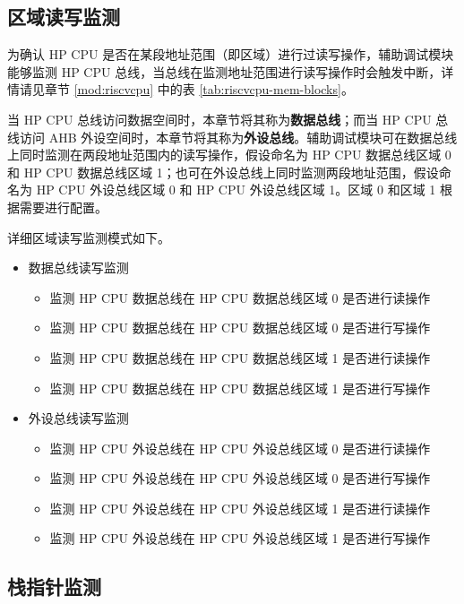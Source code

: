 \documentclass[main\_\_CN.tex]{subfiles}
\begin{document}
\subsection{区域读写监测}

为确认 HP CPU 是否在某段地址范围（即区域）进行过读写操作，辅助调试模块能够监测 HP CPU 总线，当总线在监测地址范围进行读写操作时会触发中断，详情请见章节 \ref{mod:riscvcpu} \textit{} 中的表 \ref{tab:riscvcpu-mem-blocks}。

当 HP CPU 总线访问数据空间时，本章节将其称为\textbf{数据总线}；而当 HP CPU 总线访问 AHB 外设空间时，本章节将其称为\textbf{外设总线}。辅助调试模块可在数据总线上同时监测在两段地址范围内的读写操作，假设命名为 HP CPU 数据总线区域 0 和 HP CPU 数据总线区域 1；也可在外设总线上同时监测两段地址范围，假设命名为 HP CPU 外设总线区域 0 和 HP CPU 外设总线区域 1。区域 0 和区域 1 根据需要进行配置。

详细区域读写监测模式如下。
\begin{itemize}
    \item 数据总线读写监测
        \begin{itemize}
            \item 监测 HP CPU 数据总线在 HP CPU 数据总线区域 0 是否进行读操作
            \item 监测 HP CPU 数据总线在 HP CPU 数据总线区域 0 是否进行写操作
            \item 监测 HP CPU 数据总线在 HP CPU 数据总线区域 1 是否进行读操作
            \item 监测 HP CPU 数据总线在 HP CPU 数据总线区域 1 是否进行写操作
        \end{itemize}    
    \item 外设总线读写监测
        \begin{itemize}
            \item 监测 HP CPU 外设总线在 HP CPU 外设总线区域 0 是否进行读操作
            \item 监测 HP CPU 外设总线在 HP CPU 外设总线区域 0 是否进行写操作
            \item 监测 HP CPU 外设总线在 HP CPU 外设总线区域 1 是否进行读操作
            \item 监测 HP CPU 外设总线在 HP CPU 外设总线区域 1 是否进行写操作
        \end{itemize}
\end{itemize}

\subsection{栈指针监测}
\end{document}
